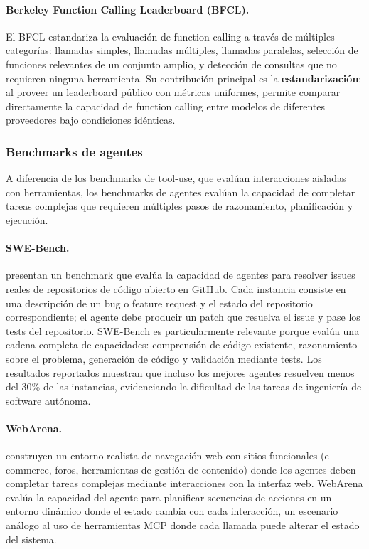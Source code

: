 \paragraph{Berkeley Function Calling Leaderboard (BFCL).} El BFCL
\citep{bfcl2024} estandariza la evaluación de function calling a través de
múltiples categorías: llamadas simples, llamadas múltiples, llamadas paralelas,
selección de funciones relevantes de un conjunto amplio, y detección de
consultas que no requieren ninguna herramienta. Su contribución principal es la
\textbf{estandarización}: al proveer un leaderboard público con métricas
uniformes, permite comparar directamente la capacidad de function calling entre
modelos de diferentes proveedores bajo condiciones idénticas.

\subsubsection{Benchmarks de agentes}

A diferencia de los benchmarks de tool-use, que evalúan interacciones aisladas
con herramientas, los benchmarks de agentes evalúan la capacidad de completar
tareas complejas que requieren múltiples pasos de razonamiento, planificación y
ejecución.

\paragraph{SWE-Bench.} \citet{swebench2024} presentan un benchmark que evalúa
la capacidad de agentes para resolver issues reales de repositorios de código
abierto en GitHub. Cada instancia consiste en una descripción de un bug o
feature request y el estado del repositorio correspondiente; el agente debe
producir un patch que resuelva el issue y pase los tests del repositorio. SWE-Bench
es particularmente relevante porque evalúa una cadena completa de capacidades:
comprensión de código existente, razonamiento sobre el problema, generación de
código y validación mediante tests. Los resultados reportados muestran que
incluso los mejores agentes resuelven menos del 30\% de las instancias,
evidenciando la dificultad de las tareas de ingeniería de software autónoma.

\paragraph{WebArena.} \citet{webarena2024} construyen un entorno realista de
navegación web con sitios funcionales (e-commerce, foros, herramientas de
gestión de contenido) donde los agentes deben completar tareas complejas
mediante interacciones con la interfaz web. WebArena evalúa la capacidad del
agente para planificar secuencias de acciones en un entorno dinámico donde el
estado cambia con cada interacción, un escenario análogo al uso de
herramientas MCP donde cada llamada puede alterar el estado del sistema.

